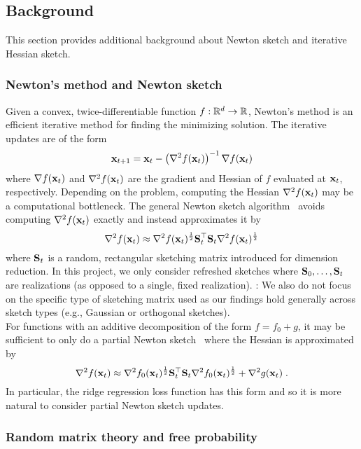 \subsection{Background} \label{sec:background}

This section provides additional background about Newton sketch and iterative Hessian sketch. \todo

\subsubsection{Newton's method and Newton sketch} \label{sec:newton}

Given a convex, twice-differentiable function $f:\mathbb{R}^d\rightarrow\mathbb{R}$, Newton's method is an efficient iterative method for finding the minimizing solution. The iterative updates are of the form
\[
\mathbf{x}_{t+1} = \mathbf{x}_t - \left(\nabla^2f(\mathbf{x}_t)\right)^{-1}\nabla f(\mathbf{x}_t)
\]
where $\nabla f(\mathbf{x}_t)$ and $\nabla^2f(\mathbf{x}_t)$ are the gradient and Hessian of $f$ evaluated at $\mathbf{x}_t$, respectively. Depending on the problem, computing the Hessian $\nabla^2f(\mathbf{x}_t)$ may be a computational bottleneck. The general Newton sketch algorithm~\citep{Pilanci:2017} avoids computing $\nabla^2f(\mathbf{x}_t)$ exactly and instead approximates it by
\[
\nabla^2f(\mathbf{x}_t) \approx \nabla^2f(\mathbf{x}_t)^\frac{1}{2}\mathbf{S}_t^\top\mathbf{S}_t\nabla^2f(\mathbf{x}_t)^\frac{1}{2}
\]
where $\mathbf{S}_t$ is a random, rectangular sketching matrix introduced for dimension reduction. In this project, we only consider refreshed sketches where $\mathbf{S}_0,\ldots,\mathbf{S}_t$ are \iid realizations (as opposed to a single, fixed realization). \todo: We also do not focus on the specific type of sketching matrix used as our findings hold generally across sketch types (e.g., \iid Gaussian or orthogonal sketches).
\\

For functions with an additive decomposition of the form $f=f_0+g$, it may be sufficient to only do a partial Newton sketch~\citep{Pilanci:2017} where the Hessian is approximated by
\[
\nabla^2f(\mathbf{x}_t) \approx \nabla^2f_0(\mathbf{x}_t)^\frac{1}{2}\mathbf{S}_t^\top\mathbf{S}_t\nabla^2f_0(\mathbf{x}_t)^\frac{1}{2} + \nabla^2g(\mathbf{x}_t) \;.
\]
In particular, the ridge regression loss function has this form and so it is more natural to consider partial Newton sketch updates.

\subsubsection{Random matrix theory and free probability}

